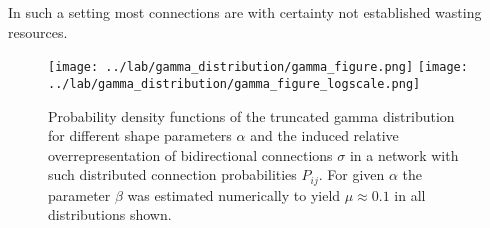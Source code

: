 In such a setting most connections are with certainty not established wasting resources.

\begin{figure}[h!]
\centering
\texttt{[image: ../lab/gamma\_distribution/gamma\_figure.png]}
\texttt{[image: ../lab/gamma\_distribution/gamma\_figure\_logscale.png]}
\caption{Probability density functions of the truncated gamma distribution for different shape parameters $\alpha$ and the induced relative overrepresentation of bidirectional connections $\sigma$ in a network with such distributed connection probabilities $P_{ij}$. For given $\alpha$ the parameter $\beta$ was estimated numerically to yield $\mu \approx 0.1$ in all distributions shown.}
\end{figure}




